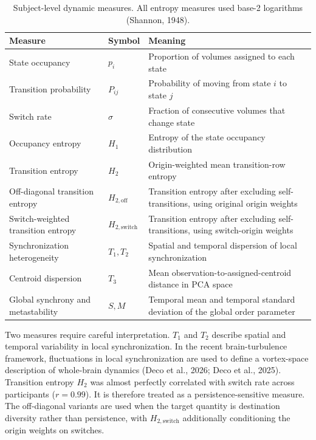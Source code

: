 \documentclass[12pt,a4paper]{report}
\newcommand{\compacttablestyle}{%
  \captionsetup{font=footnotesize,skip=2pt}%
  \small
  \setlength{\tabcolsep}{3pt}%
  \renewcommand{\arraystretch}{0.85}%
}
\begin{document}
\begin{table}[htbp]
\centering
\compacttablestyle
\caption{Subject-level dynamic measures. All entropy measures used base-2 logarithms (Shannon, 1948).}
\label{tab:subject_dynamic_measures}
\begin{tabular}{p{} p{} p{}}
\toprule
\textbf{Measure} & \textbf{Symbol} & \textbf{Meaning} \\
\midrule
State occupancy & $p_i$ & Proportion of volumes assigned to each state \\
Transition probability & $P_{ij}$ & Probability of moving from state $i$ to state $j$ \\
Switch rate & $\sigma$ & Fraction of consecutive volumes that change state \\
Occupancy entropy & $H_1$ & Entropy of the state occupancy distribution \\
Transition entropy & $H_2$ & Origin-weighted mean transition-row entropy \\
Off-diagonal transition entropy & $H_{2,\mathrm{off}}$ & Transition entropy after excluding self-transitions, using original origin weights \\
Switch-weighted transition entropy & $H_{2,\mathrm{switch}}$ & Transition entropy after excluding self-transitions, using switch-origin weights \\
Synchronization heterogeneity & $T_1, T_2$ & Spatial and temporal dispersion of local synchronization \\
Centroid dispersion & $T_3$ & Mean observation-to-assigned-centroid distance in PCA space \\
Global synchrony and metastability & $S, M$ & Temporal mean and temporal standard deviation of the global order parameter \\
\bottomrule
\end{tabular}
\end{table}
Two measures require careful interpretation. $T_1$ and $T_2$ describe spatial and temporal variability in local synchronization. In the recent brain-turbulence framework, fluctuations in local synchronization are used to define a vortex-space description of whole-brain dynamics (Deco et al., 2026; Deco et al., 2025). Transition entropy $H_2$ was almost perfectly correlated with switch rate across participants ($r = 0.99$). It is therefore treated as a persistence-sensitive measure. The off-diagonal variants are used when the target quantity is destination diversity rather than persistence, with $H_{2,\mathrm{switch}}$ additionally conditioning the origin weights on switches.
\end{document}
